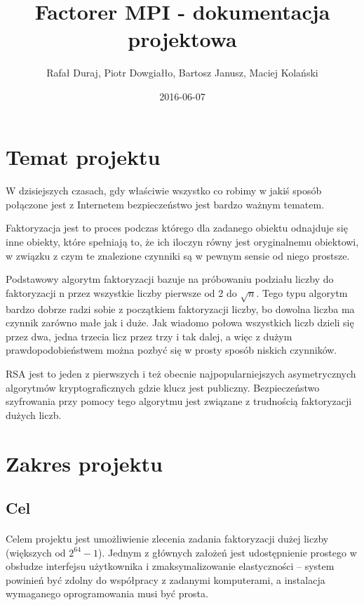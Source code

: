 \documentclass{article}
\title{Factorer MPI - dokumentacja projektowa}
\date{2016-06-07}
\author{Rafał Duraj, Piotr Dowgiałło, Bartosz Janusz, Maciej Kolański}
\begin{document}
\maketitle
\newpage  
{}

\tableofcontents
\newpage

\section{Temat projektu}

\paragraph{}W dzisiejszych czasach, gdy właściwie wszystko co robimy w jakiś sposób połączone jest z Internetem bezpieczeństwo jest bardzo ważnym tematem.

Faktoryzacja jest to proces podczas którego dla zadanego obiektu odnajduje się inne obiekty, które spełniają to, że ich iloczyn równy jest oryginalnemu obiektowi, w związku z czym te znalezione czynniki są w pewnym sensie od niego prostsze.

Podstawowy algorytm faktoryzacji bazuje na próbowaniu podziału liczby do faktoryzacji n przez wszystkie liczby pierwsze od 2 do $\sqrt{n}$. Tego typu algorytm bardzo dobrze radzi sobie z początkiem faktoryzacji liczby, bo dowolna liczba ma czynnik zarówno małe jak i duże. Jak wiadomo połowa wszystkich liczb dzieli się przez dwa, jedna trzecia licz przez trzy i tak dalej, a więc z dużym prawdopodobieństwem można pozbyć się w prosty sposób niskich czynników.

RSA jest to jeden z pierwszych i też obecnie najpopularniejszych asymetrycznych algorytmów kryptograficznych gdzie klucz jest publiczny. Bezpieczeństwo szyfrowania przy pomocy tego algorytmu jest związane z trudnością faktoryzacji dużych liczb.

\section{Zakres projektu}
\subsection{Cel}

\paragraph{}Celem projektu jest umożliwienie zlecenia zadania faktoryzacji dużej liczby (większych od $2^{64} -1$). Jednym z głównych założeń jest udostępnienie prostego w obsłudze interfejsu użytkownika i zmaksymalizowanie elastyczności – system powinień być zdolny do współpracy z zadanymi komputerami, a instalacja wymaganego oprogramowania musi być prosta. 
\end{document}
